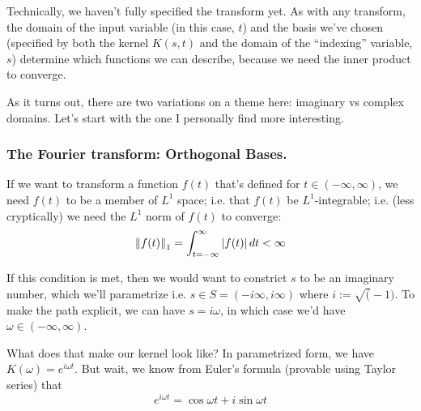\documentclass[letterpaper,12pt]{report}
\begin{document}
Technically, we haven't fully specified the transform yet.
As with any transform, the domain of the input variable 
(in this case, \(t\)) and the basis we've chosen
(specified by both the kernel \(K(s,t)\) and the domain of
the ``indexing'' variable, \(s\)) determine which functions
we can describe, because we need the inner product 
\innerprod[K(s,t)][f(t)] to converge.\par

As it turns out, there are two variations on a theme here:
imaginary vs complex domains.
Let's start with the one I personally find more interesting.

\subsubsection{The Fourier transform: Orthogonal Bases.}

If we want to transform a function \(f(t)\) that's defined
for \(t \in (-\infty, \infty)\), we need \(f(t)\) to be a member
of \(L^1\) space; i.e. that \(f(t)\) be \(L^1\)-integrable; 
i.e. (less cryptically) we need the \(L^1\) norm of \(f(t)\)
to converge:
\[\norm[f(t)]_1 = 
  \int_{t=-\infty}^{\infty} \abs{f(t)} dt < \infty \]

If this condition is met, then we would want to constrict
\(s\) to be an imaginary number, which we'll parametrize
i.e. \(s \in S = (-i\infty, i\infty)\) 
where \(i := \sqrt(-1)\).
To make the path explicit, we can have \(s = i\omega\),
in which case we'd have \(\omega \in (-\infty, \infty)\).\par

What does that make our kernel look like?
In parametrized form, we have \(K(\omega) = e^{i\omega t}\).
But wait, we know from Euler's formula
(provable using Taylor series) that
\[e^{i\omega t} = \cos{\omega t} + i\sin{\omega t} \]
\end{document}
